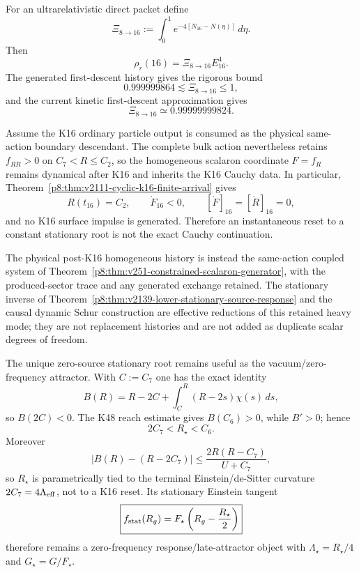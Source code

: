 \documentclass[12pt,a4paper]{article}
\begin{document}
\begin{definition}
\label{p8:def:v2134-reheating-dilution}
For an ultrarelativistic direct packet define
\[
 \boxed{\Xi_{8\to16}
 :=\int_0^1e^{-4[N_{16}-N(\eta)]}\,d\eta.}
\]
Then
\[
 \rho_r(16)=\Xi_{8\to16}E_{16}^4.
\]
The generated first-descent history gives the rigorous bound
\[
 0.999999864\lesssim\Xi_{8\to16}\le1,
\]
and the current kinetic first-descent approximation gives
\[
 \boxed{\Xi_{8\to16}\simeq0.99999999824}.
\]
\end{definition}

\begin{theorem}
\label{p8:thm:v2134-post16-stationary-schur}
Assume the K16 ordinary particle output is consumed as the physical
same-action boundary descendant.  The complete bulk action nevertheless retains
$f_{RR}>0$ on $C_7<R\le C_2$, so the homogeneous scalaron coordinate $F=f_R$
remains dynamical after K16 and inherits the K16 Cauchy data.  In particular,
Theorem~\ref{p8:thm:v2111-cyclic-k16-finite-arrival} gives
\[
 R(t_{16})=C_2,\qquad \dot F_{16}<0,\qquad
 [\dot F]_{16}=[\dot R]_{16}=0,
\]
and no K16 surface impulse is generated.  Therefore an instantaneous reset to
a constant stationary root is not the exact Cauchy continuation.

The physical post-K16 homogeneous history is instead the same-action coupled
system of Theorem~\ref{p8:thm:v251-constrained-scalaron-generator}, with the
produced-sector trace and any generated exchange retained.  The stationary
inverse of Theorem~\ref{p8:thm:v2139-lower-stationary-source-response} and the
causal dynamic Schur construction are effective reductions of this retained
heavy mode; they are not replacement histories and are not added as duplicate
scalar degrees of freedom.

The unique zero-source stationary root remains useful as the vacuum/zero-frequency
attractor.  With $C:=C_7$ one has the exact identity
\[
 B(R)=R-2C+\int_C^R(R-2s)\chi(s)\,ds,
\]
so $B(2C)<0$.  The K48 reach estimate gives $B(C_6)>0$, while $B'>0$;
hence
\[
 \boxed{2C_7<R_\star<C_6.}
\]
Moreover
\[
 \boxed{\left|B(R)-(R-2C_7)\right|
 \le \frac{2R(R-C_7)}{U+C_7}},
\]
so $R_\star$ is parametrically tied to the terminal Einstein/de-Sitter
curvature $2C_7=4\Lambda_{\rm eff}$, not to a K16 reset.  Its stationary
Einstein tangent
\[
 \boxed{f_{\rm stat}(R_g)=F_\star\left(R_g-\frac{R_\star}{2}\right)}
\]
therefore remains a zero-frequency response/late-attractor object with
$\Lambda_\star=R_\star/4$ and $G_\star=G/F_\star$.
\end{theorem}
\end{document}

